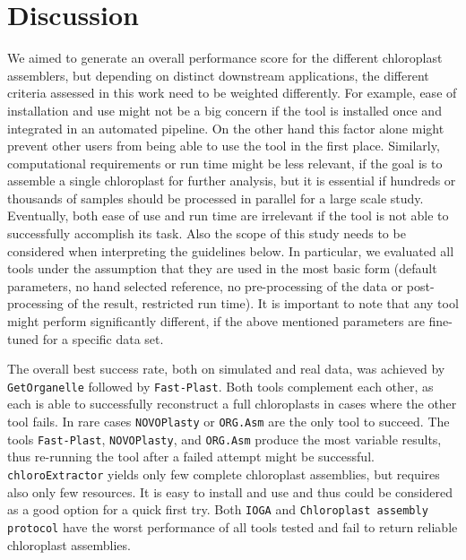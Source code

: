 \documentclass{bmcart}
\newcommand{\formatprogramnames}[1]{\texttt{#1}}
\newcommand{\ce}{\formatprogramnames{chloroExtractor}}
\newcommand{\oa}{\formatprogramnames{ORG.Asm}}
\newcommand{\fp}{\formatprogramnames{Fast-Plast}}
\newcommand{\ioga}{\formatprogramnames{IOGA}}
\newcommand{\np}{\formatprogramnames{NOVOPlasty}}
\newcommand{\go}{\formatprogramnames{GetOrganelle}}
\newcommand{\cassp}{\formatprogramnames{Chloroplast assembly protocol}}
\begin{document}
\section*{Discussion}
We aimed to generate an overall performance score for the different chloroplast assemblers, but depending on distinct downstream applications, the different criteria assessed in this work need to be weighted differently.
For example, ease of installation and use might not be a big concern if the tool is installed once and integrated in an automated pipeline. On the other hand this factor alone might prevent other users from being able to use the tool in the first place.
Similarly, computational requirements or run time might be less relevant, if the goal is to assemble a single chloroplast for further analysis, but it is essential if hundreds or thousands of samples should be processed in parallel for a large scale study.
Eventually, both ease of use and run time are irrelevant if the tool is not able to successfully accomplish its task.
Also the scope of this study needs to be considered when interpreting the guidelines below.
In particular, we evaluated all tools under the assumption that they are used in the most basic form (default parameters, no hand selected reference, no pre-processing of the data or post-processing of the result, restricted run time).
It is important to note that any tool might perform significantly different, if the above mentioned parameters  are fine-tuned for a specific data set.

The overall best success rate, both on simulated and real data, was achieved by \go{} followed by \fp{}.
Both tools complement each other, as each is able to successfully reconstruct a full chloroplasts in cases where the other tool fails. 
In rare cases \np{} or \oa{} are the only tool to succeed.
The tools \fp{}, \np{}, and \oa{} produce the most variable results, thus re-running the tool after a failed attempt might be successful.
\ce{} yields only few complete chloroplast assemblies, but requires also only few resources. It is easy to install and use and thus could be considered as a good option for a quick first try.
Both \ioga{} and \cassp{} have the worst performance of all tools tested and fail to return reliable chloroplast assemblies.
\end{document}
